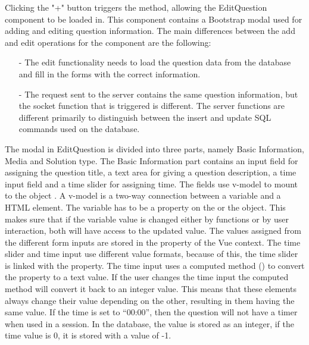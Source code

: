 \noindent
Clicking the "+" button triggers the  method, allowing the EditQuestion component to be loaded in. This component contains a Bootstrap modal used for adding and editing question information. The main differences between the add and edit operations for the component are the following:
\begin{itemize}
\item[-] The edit functionality needs to load the question data from the database and fill in the forms with the correct information. 
\item[-] The request sent to the server contains the same question information, but the socket function that is triggered is different. The server functions are different primarily to distinguish between the insert and update SQL commands used on the database.
\end{itemize} 
The modal in EditQuestion is divided into three parts, namely Basic Information, Media and Solution type. The Basic Information part contains an input field for assigning the question title, a text area for giving a question description, a time input field and a time slider for assigning time. The fields use v-model to mount to the object . A v-model is a two-way connection between a variable and a HTML element. The variable has to be a property on the  or the  object. This makes sure that if the variable value is changed either by functions or by user interaction, both will have access to the updated value.  The values assigned from the different form inputs are stored in the  property of the Vue context. The time slider and time input use different value formats, because of this, the time slider is linked with the  property. The time input uses a computed method () to convert the  property to a text value. If the user changes the time input the computed method will convert it back to an integer value. This means that these elements always change their value depending on the other, resulting in them having the same value. If the time is set to “00:00”, then the question will not have a timer when used in a session. In the database, the value is stored as an integer, if the time value is 0, it is stored with a value of -1.
\\[11pt]
